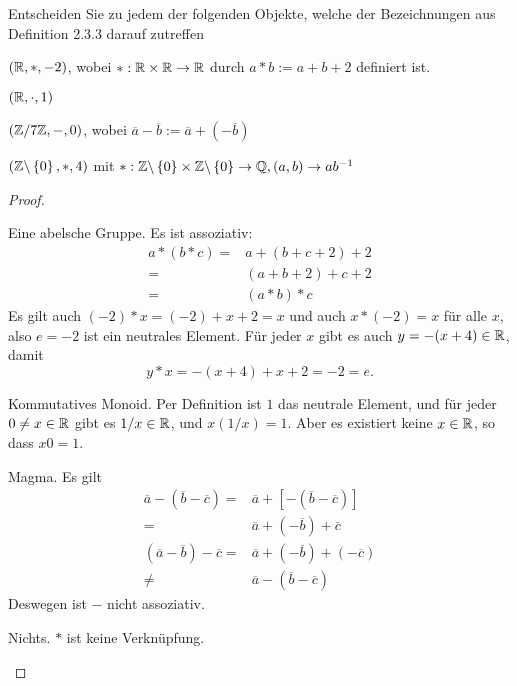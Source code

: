 \begin{Problem}
	Entscheiden Sie zu jedem der folgenden Objekte, welche der Bezeichnungen aus Definition 2.3.3 darauf zutreffen
	\begin{parts}
		\item $(\mathbb{R}, *,-2)$, wobei $*:\mathbb{R}\times \mathbb{R}\to \mathbb{R}$ durch $a*b:=a+b+2$ definiert ist.
		\item $(\mathbb{R}, \cdot, 1)$
		\item  $\left( \mathbb{Z} / 7\mathbb{Z}, -, 0 \right) $, wobei $\overline{a}-\overline{b}:=\overline{a}+(-\overline{b})$
		\item $\left( \mathbb{Z} \backslash \left\{ 0 \right\} ,*,4 \right) $ mit $*:\mathbb{Z} \backslash \left\{ 0 \right\} \times \mathbb{Z} \backslash \left\{ 0 \right\} \to \mathbb{Q}, (a,b)\to ab^{-1}$
	\end{parts}
\end{Problem}
\begin{proof}
	\begin{parts}
	\item Eine abelsche Gruppe. Es ist assoziativ:
		\begin{align*}
			a*(b*c)=&a+(b+c+2)+2\\
			=&(a+b+2)+c+2\\
			=&(a*b)*c
		\end{align*}
		Es gilt auch $(-2)*x=(-2)+x+2=x $ und auch $x*(-2)=x$ f\"{u}r alle $x$, also $e=-2$ ist ein neutrales Element. F\"{u}r jeder $x$ gibt es auch $y=-(x+4)\in \mathbb{R}$, damit
		\[
		y*x=-(x+4)+x+2=-2=e
		.\] 
	\item Kommutatives Monoid. Per Definition ist $1$ das neutrale Element, und f\"{u}r jeder $0\neq x\in \mathbb{R}$ gibt es $1 / x \in \mathbb{R}$, und $x\left( 1 / x \right) =1$. Aber es existiert keine $x\in \mathbb{R}$, so dass $x 0 = 1$.
	\item Magma. Es gilt
		\begin{align*}
			\overline{a}-(\overline{b}-\overline{c})=&\overline{a}+\left[ -\left(\overline{b}-\overline{c} \right)  \right] \\
			=&\overline{a}+(-\overline{b})+\overline{c}\\
			(\overline{a}-\overline{b})-\overline{c}=&\overline{a}+(-\overline{b})+(-\overline{c})\\
			\neq & \overline{a}-(\overline{b}-\overline{c})
		\end{align*}
		Deswegen ist $-$ nicht assoziativ. 
	\item Nichts. $*$ ist keine Verknüpfung.
	\end{parts}
\end{proof}
